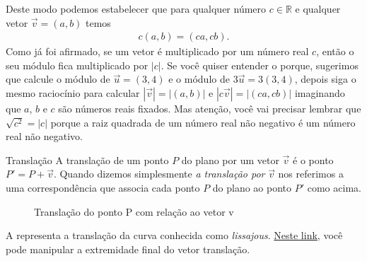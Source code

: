 Deste modo podemos estabelecer que para qualquer número \(c \in \mathbb{R}\) e qualquer vetor \(\vec{v}=(a,b)\) temos
\begin{equation*}
\begin{split}c(a,b)=(ca,cb).\end{split}
\end{equation*}
Como já foi afirmado, se um vetor é multiplicado por um número real \(c\), então o seu módulo fica multiplicado por \(|c|\). Se você quiser entender o porque, sugerimos que calcule o módulo de \(\vec{u}=(3,4)\) e o módulo de \(3\vec{u}=3(3,4)\), depois siga o mesmo raciocínio para calcular \(|\vec{v}|=|(a,b)|\) e \(|c\vec{v}|=|(ca,cb)|\) imaginando que \(a\), \(b\) e \(c\) são números reais fixados. Mas atenção, você vai precisar lembrar que \(\sqrt{c^2}=|c|\) porque a raiz quadrada de um número real não negativo é um número real não negativo.
\begin{observationtitle}{Translação}
A translação de um ponto \(P\) do plano por um vetor \(\vec{v}\) é o ponto \(P'=P+\vec{v}\). Quando dizemos simplesmente \textit{a translação por} \(\vec{v}\) nos referimos a uma correspondência que associa cada ponto \(P\) do plano ao ponto \(P'\) como acima.

\begin{figure}[H]
\centering

\caption{Translação do ponto P com relação ao vetor v}
\end{figure}
\end{observationtitle}

A  representa a translação da curva conhecida como \textit{lissajous}. \href{https://www.geogebra.org/m/bWpc8guU}{Neste link}, você pode manipular a extremidade final do vetor translação.

